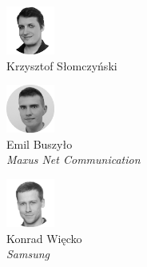 \begin{minipage}[t]{0.33\textwidth}
	\center     
    \includegraphics[width=60px]{img/people/czarno_biale/krzysztof-crop.png}   \\
    Krzysztof Słomczyński \\
    \textit{}
\end{minipage}
\begin{minipage}[t]{0.33\textwidth}
	\center 
    \includegraphics[width=60px]{img/people/czarno_biale/emilb.png}    \\
    Emil Buszyło \\
	\textit{Maxus Net Communication}  
\end{minipage}
\begin{minipage}[t]{0.33\textwidth}
	\center     
    \includegraphics[width=60px]{img/people/czarno_biale/konrad-crop.png}   \\
    Konrad Więcko \\
	\textit{Samsung}
\end{minipage}